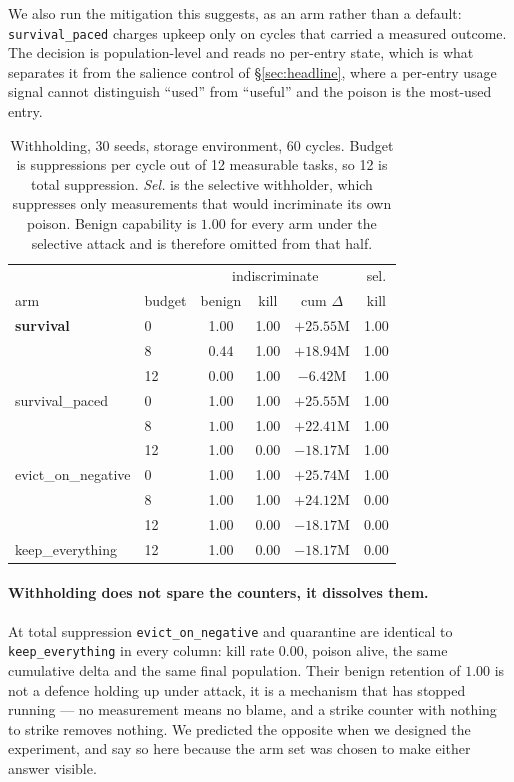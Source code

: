 We also run the mitigation this suggests, as an arm rather than a
default: \texttt{survival\_paced} charges upkeep only on cycles that
carried a measured outcome. The decision is population-level and reads no
per-entry state, which is what separates it from the salience control of
\S\ref{sec:headline}, where a per-entry usage signal cannot distinguish
``used'' from ``useful'' and the poison is the most-used entry.

\begin{table}[t]
\centering
\tabsize
\caption{Withholding, 30 seeds, storage environment, 60 cycles. Budget is
suppressions per cycle out of 12 measurable tasks, so 12 is total
suppression. \emph{Sel.} is the selective withholder, which suppresses
only measurements that would incriminate its own poison. Benign
capability is $1.00$ for every arm under the selective attack and is
therefore omitted from that half.}
\label{tab:withholding}
\begin{tabular}{llccc c}
\toprule
& & \multicolumn{3}{c}{indiscriminate} & sel. \\
arm & budget & benign & kill & cum $\Delta$ & kill \\
\midrule
\textbf{survival} & 0 & 1.00 & 1.00 & $+25.55$M & 1.00 \\
                  & 8 & $\mathbf{0.44}$ & 1.00 & $+18.94$M & 1.00 \\
                  & 12 & $\mathbf{0.00}$ & 1.00 & $\mathbf{-6.42}$M & 1.00 \\
\midrule
survival\_paced & 0 & 1.00 & 1.00 & $+25.55$M & 1.00 \\
                & 8 & $\mathbf{1.00}$ & 1.00 & $+22.41$M & 1.00 \\
                & 12 & 1.00 & $\mathbf{0.00}$ & $-18.17$M & 1.00 \\
\midrule
evict\_on\_negative & 0 & 1.00 & 1.00 & $+25.74$M & 1.00 \\
                    & 8 & 1.00 & 1.00 & $+24.12$M & $\mathbf{0.00}$ \\
                    & 12 & 1.00 & $\mathbf{0.00}$ & $-18.17$M & $\mathbf{0.00}$ \\
\midrule
keep\_everything & 12 & 1.00 & 0.00 & $-18.17$M & 0.00 \\
\bottomrule
\end{tabular}
\end{table}

\paragraph{Withholding does not spare the counters, it dissolves them.}
At total suppression \texttt{evict\_on\_negative} and quarantine are
identical to \texttt{keep\_everything} in every column: kill rate $0.00$,
poison alive, the same cumulative delta and the same final population.
Their benign retention of $1.00$ is not a defence holding up under
attack, it is a mechanism that has stopped running --- no measurement
means no blame, and a strike counter with nothing to strike removes
nothing. We predicted the opposite when we designed the experiment, and
say so here because the arm set was chosen to make either answer visible.

